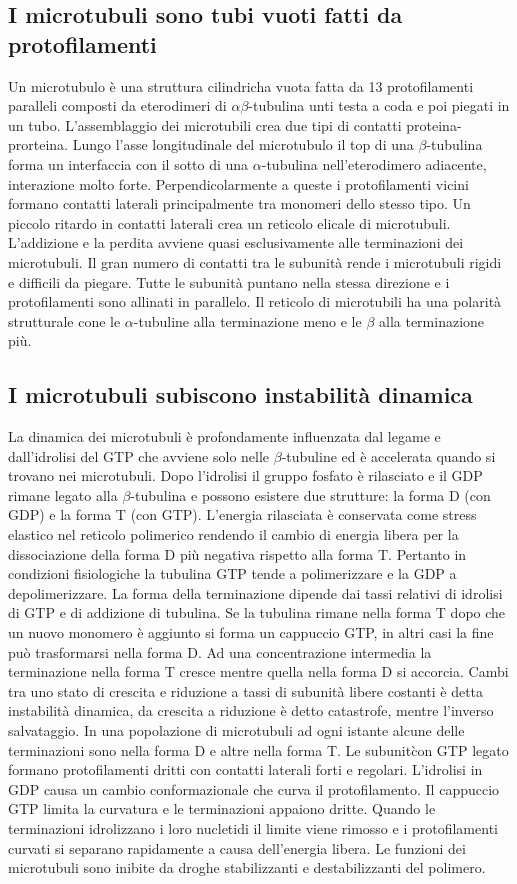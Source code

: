 \subsection{I microtubuli sono tubi vuoti fatti da protofilamenti}
Un microtubulo \`e una struttura cilindricha vuota fatta da 13 protofilamenti paralleli composti da eterodimeri di $\alpha\beta$-tubulina unti testa a coda e poi piegati in un tubo. 
L'assemblaggio dei microtubili crea due tipi di contatti proteina-prorteina. Lungo l'asse longitudinale del microtubulo il top di una $\beta$-tubulina forma un interfaccia con il sotto
di una $\alpha$-tubulina nell'eterodimero adiacente, interazione molto forte. Perpendicolarmente a queste i protofilamenti vicini formano contatti laterali principalmente tra monomeri
dello stesso tipo. Un piccolo ritardo in contatti laterali crea un reticolo elicale di microtubuli. L'addizione e la perdita avviene quasi esclusivamente alle terminazioni dei 
microtubuli. Il gran numero di contatti tra le subunit\`a rende i microtubuli rigidi e difficili da piegare. Tutte le subunit\`a puntano nella stessa direzione e i protofilamenti sono
allinati in parallelo. Il reticolo di microtubili ha una polarit\`a strutturale cone le $\alpha$-tubuline alla terminazione meno e le $\beta$ alla terminazione pi\`u. 
\subsection{I microtubuli subiscono instabilit\`a dinamica}
La dinamica dei microtubuli \`e profondamente influenzata dal legame e dall'idrolisi del GTP che avviene solo nelle $\beta$-tubuline ed \`e accelerata quando si trovano nei microtubuli.
Dopo l'idrolisi il gruppo fosfato \`e rilasciato e il GDP rimane legato alla $\beta$-tubulina e possono esistere due strutture: la forma D (con GDP) e la forma T (con GTP). L'energia
rilasciata \`e conservata come stress elastico nel reticolo polimerico rendendo il cambio di energia libera per la dissociazione della forma D pi\`u negativa rispetto alla forma T. 
Pertanto in condizioni fisiologiche la tubulina GTP tende a polimerizzare e la GDP a depolimerizzare. La forma della terminazione dipende dai tassi relativi di idrolisi di GTP e 
di addizione di tubulina. Se la tubulina rimane nella forma T dopo che un nuovo monomero \`e aggiunto si forma un cappuccio GTP, in altri casi la fine pu\`o trasformarsi nella forma D.
Ad una concentrazione intermedia la terminazione nella forma T cresce mentre quella nella forma D si accorcia. Cambi tra uno stato di crescita e riduzione a tassi di subunit\`a libere
costanti \`e detta instabilit\`a dinamica, da crescita a riduzione \`e detto catastrofe, mentre l'inverso salvataggio. In una popolazione di microtubuli ad ogni istante alcune delle
terminazioni sono nella forma D e altre nella forma T. Le subunit\` con GTP legato formano protofilamenti dritti con contatti laterali forti e regolari. L'idrolisi in GDP causa un
cambio conformazionale che curva il protofilamento. Il cappuccio GTP limita la curvatura e le terminazioni appaiono dritte. Quando le terminazioni idrolizzano i loro nucletidi il 
limite viene rimosso e i protofilamenti curvati si separano rapidamente a causa dell'energia libera. Le funzioni dei microtubuli sono inibite da droghe stabilizzanti e destabilizzanti
del polimero. 
